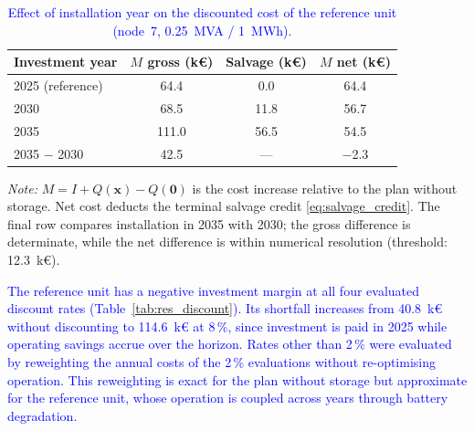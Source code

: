 \documentclass[preprint,12pt]{elsarticle}
\begin{document}
\begin{table}[htbp!]
    \centering
    \caption{\textcolor{blue}{Effect of installation year on the discounted cost of the reference unit (node~7, 0.25~MVA / 1~MWh).}}
    \label{tab:res_year_ladder}
    \footnotesize\setlength{\tabcolsep}{5pt}
    \begin{tabular}{l c c c}
        \toprule
        Investment year & $M$ gross (k\euro) & Salvage (k\euro) & $M$ net (k\euro) \\
        \midrule
        2025 (reference) & 64.4  & 0.0  & 64.4 \\
        2030             & 68.5  & 11.8 & 56.7 \\
        2035             & 111.0 & 56.5 & 54.5 \\
        2035 $-$ 2030    & 42.5  & ---  & $-$2.3 \\
        \bottomrule
    \end{tabular}
    \par\smallskip
    \begin{minipage}{\linewidth}
        \footnotesize\raggedright
        \textit{Note:}
        $M = I + Q(\boldsymbol{x}) - Q(\boldsymbol{0})$ is the cost increase relative to the plan without storage.
        Net cost deducts the terminal salvage credit \eqref{eq:salvage_credit}.
        The final row compares installation in 2035 with 2030; the gross difference is determinate, while the net difference is within numerical resolution (threshold: 12.3~k\euro{}).
    \end{minipage}
\end{table}

\textcolor{blue}{
    The reference unit has a negative investment margin at all four evaluated discount rates (Table~\ref{tab:res_discount}). Its shortfall increases from 40.8~k\euro{} without discounting to 114.6~k\euro{} at 8\,\%, since investment is paid in 2025 while operating savings accrue over the horizon. Rates other than 2\,\% were evaluated by reweighting the annual costs of the 2\,\% evaluations without re-optimising operation. This reweighting is exact for the plan without storage but approximate for the reference unit, whose operation is coupled across years through battery degradation.
}
\end{document}
